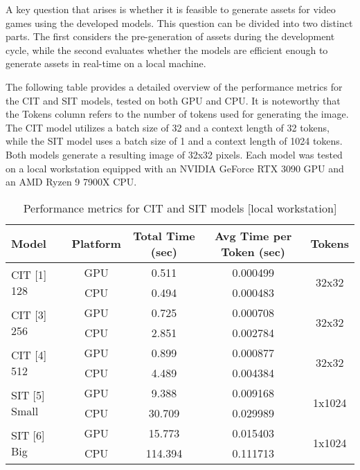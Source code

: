     A key question that arises is whether it is feasible to generate assets for video games using the developed models. This question can be divided into two distinct parts. The first considers the pre-generation of assets during the development cycle, while the second evaluates whether the models are efficient enough to generate assets in real-time on a local machine.

    The following table provides a detailed overview of the performance metrics for the CIT and SIT models, tested on both GPU and CPU. It is noteworthy that the Tokens column refers to the number of tokens used for generating the image. The CIT model utilizes a batch size of 32 and a context length of 32 tokens, while the SIT model uses a batch size of 1 and a context length of 1024 tokens. Both models generate a resulting image of 32x32 pixels. Each model was tested on a local workstation equipped with an NVIDIA GeForce RTX 3090 GPU and an AMD Ryzen 9 7900X CPU.

    \begin{table}[H]
        \centering
        \small
        \begin{tabular}{|l|c|c|c|c|}
        \hline
        \textbf{Model} & \textbf{Platform} & \textbf{Total Time (sec)} & \textbf{Avg Time per Token (sec)} & \textbf{Tokens} \\ \hline
        \multirow{2}{*}{CIT [1] 128} & GPU & 0.511 & 0.000499 & \multirow{2}{*}{32x32} \\ \cline{2-4}
                                           & CPU  & 0.494 & 0.000483 &  \\ \hline
        \multirow{2}{*}{CIT [3] 256} & GPU & 0.725 & 0.000708 & \multirow{2}{*}{32x32} \\ \cline{2-4}
                                           & CPU  & 2.851 & 0.002784 &  \\ \hline
        \multirow{2}{*}{CIT [4] 512} & GPU & 0.899 & 0.000877 & \multirow{2}{*}{32x32} \\ \cline{2-4}
                                           & CPU  & 4.489 & 0.004384 &  \\ \hline
        \multirow{2}{*}{SIT [5] Small} & GPU & 9.388 & 0.009168 & \multirow{2}{*}{1x1024} \\ \cline{2-4}
                                             & CPU  & 30.709 & 0.029989 &  \\ \hline
        \multirow{2}{*}{SIT [6] Big} & GPU & 15.773 & 0.015403 & \multirow{2}{*}{1x1024} \\ \cline{2-4}
                                           & CPU  & 114.394 & 0.111713 &  \\ \hline
        \end{tabular}
        \caption{Performance metrics for CIT and SIT models [local workstation]}
        \label{tab:performance_metrics}
    \end{table}
        
